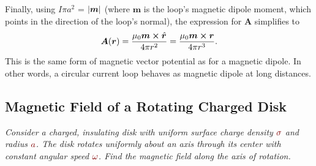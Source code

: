 \documentclass[11pt, a4paper]{article}
\newcommand{\dmath}[1]{\textcolor{Maroon}{#1}}  %
\renewcommand{\vec}[1]{\bm{#1}} %
\newcommand{\uvec}[1]{\hat{\vec{#1}}} %
\renewcommand{\r}{\vec{r}}
\newcommand{\A}{\vec{A}}  %
\newcommand{\m}{\vec{m}}  %
\begin{document}
\begin{itemize}
	
	Finally, using $ I \pi a^{2} $ = $ \abs{\vec{m}} $ (where $ \m $ is the loop's magnetic dipole moment, which points in the direction of the loop's normal), the expression for $ \A $ simplifies to
	\begin{equation*}
		\A(\r) = \frac{\mu_{0} \m \cross \uvec{r}}{4\pi r^{2}} = \frac{\mu_{0} \m \cross \r}{4\pi r^{3}}.
	\end{equation*}
	This is the same form of magnetic vector potential as for a magnetic dipole. In other words, a circular current loop behaves as magnetic dipole at long distances.
	
\end{itemize}

\subsection{Magnetic Field of a Rotating Charged Disk}
\textit{Consider a charged, insulating disk with uniform surface charge density $ \dmath{\sigma} $ and radius $ \dmath{a} $. The disk rotates uniformly about an axis through its center with constant angular speed $ \dmath{\omega} $. Find the magnetic field along the axis of rotation.}
\end{document}

